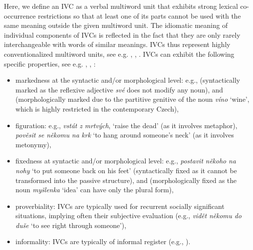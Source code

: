 \documentclass[output=paper
,modfonts
,nonflat]{langsci/langscibook}
\begin{document}
Here, we define an IVC as a verbal multiword unit that exhibits strong lexical 
co-occurrence restrictions so that at least one of its parts cannot be used with 
the same meaning outside the given multiword unit. The idiomatic meaning of 
individual components of IVCs is reflected in the fact that they are only rarely 
interchangeable with words of similar meanings. 
IVCs thus represent highly conventionalized multiword units, see e.g. 
\citet{everaert-14}, \citet{granger-08}, \citet{cowie-01}. IVCs can 
exhibit the following specific properties, see e.g. \citet{burger-07}, 
\citet{cermak-01}, \citet{everaert-14}:

\begin{itemize}
\item
markedness at the syntactic and/or morphological level: e.g.,  (syntactically marked as the reflexive 
adjective \textit{své} does not modify any noun), and  
(morphologically marked due to the partitive genitive of the noun \textit{víno} 
`wine', which is highly restricted in the contemporary Czech),
 
\item
figuration: e.g., \textit{vstát z mrtvých}, `raise the dead' (as it involves 
metaphor), \textit{pověsit se někomu na krk} `to hang around someone's neck' 
(as it involves metonymy),

\item
fixedness at syntactic and/or morphological level: e.g., 
\textit{postavit někoho na nohy} `to put someone back on his feet' 
(syntactically fixed as it cannot be transformed into the passive structure), 
and  (morphologically fixed as the noun \textit{myšlenka} 
`idea' can have only the plural form),

\item
proverbiality: IVCs are typically used for recurrent socially significant 
situations, implying often their subjective evaluation (e.g., \textit{vidět 
někomu do duše} `to see right through someone'),

\item
informality: IVCs are typically of informal register (e.g., ).
\end{itemize}
\end{document}
